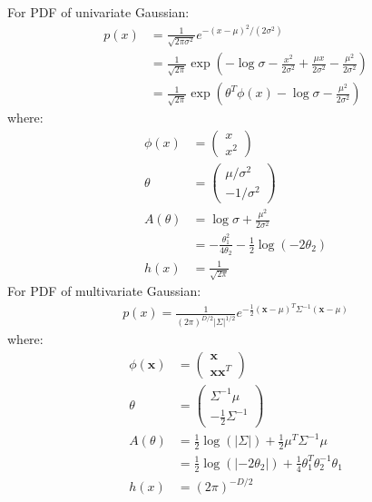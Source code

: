 \documentclass{article}
\begin{document}
For PDF of univariate Gaussian:
\begin{align*}
p(x) 	&= \frac{1}{\sqrt{2\pi \sigma^2}} e^{-(x-\mu)^2 / (2\sigma^2)} \\
	&= \frac{1}{\sqrt{2\pi}} \exp \left( -\log\sigma -\frac{x^2}{2\sigma^2} + \frac{\mu x}{2\sigma^2} - \frac{\mu^2}{2\sigma^2}  \right) \\
	&= \frac{1}{\sqrt{2\pi}} \exp \left( \theta^T \phi(x) -\log\sigma - \frac{\mu^2}{2\sigma^2}  \right)
\end{align*}
where:
\begin{align*}
	\phi(x) &= \begin{pmatrix}x \\ x^2 \end{pmatrix} \\
	\theta &= \begin{pmatrix}\mu/\sigma^2 \\ -1/\sigma^2 \end{pmatrix} \\
	A(\theta) &= \log\sigma + \frac{\mu^2}{2\sigma^2} \\
		&= -\frac{\theta_1^2}{4\theta_2} - \frac{1}{2} \log(-2\theta_2)  \\
	h(x) &= \frac{1}{\sqrt{2\pi}}
\end{align*}
For PDF of multivariate Gaussian:
\begin{align*}
	p(x) = \frac{1}{(2\pi)^{D/2} |\Sigma|^{1/2}} e^{ -\frac{1}{2} (\mathbf{x}-\mu)^T \Sigma^{-1}(\mathbf{x}-\mu)}
\end{align*}
where:
\begin{align*}
	\phi(\mathbf{x}) &=  \begin{pmatrix}\mathbf{x} \\ \mathbf{x}\mathbf{x}^T \end{pmatrix} \\
	\theta &=  \begin{pmatrix}\Sigma^{-1}\mu \\  -\frac{1}{2}\Sigma^{-1} \end{pmatrix} \\
	A(\theta) &= \frac{1}{2}\log(|\Sigma|) + \frac{1}{2} \mu^T \Sigma^{-1} \mu\\
			&= \frac{1}{2} \log(|-2\theta_2|) +  \frac{1}{4}\theta_1^T \theta_2^{-1} \theta_1\\
	h(x) &= (2\pi)^{-D/2}
\end{align*}
\end{document}
